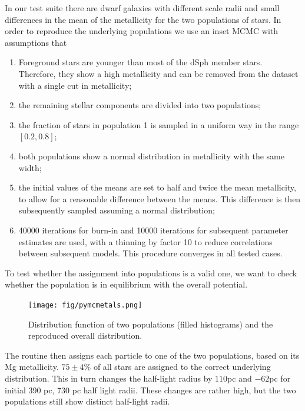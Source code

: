 In our test suite there are dwarf galaxies with different scale radii
and small differences in the mean of the metallicity for the two
populations of stars. In order to reproduce the underlying populations
we use an inset MCMC with assumptions that

\begin{enumerate}
\item Foreground stars are younger than most of the dSph member
  stars. Therefore, they show a high metallicity and can be removed
  from the dataset with a single cut in metallicity;
\item the remaining stellar components are divided into two
  populations;
\item the fraction of stars in population 1 is sampled in a uniform
  way in the range $[0.2,0.8]$;
\item both populations show a normal distribution in metallicity with
  the same width;
\item the initial values of the means are set to half and twice the
  mean metallicity, to allow for a reasonable difference between the
  means. This difference is then subsequently sampled assuming a
  normal distribution;
\item 40000 iterations for burn-in and 10000 iterations for subsequent
  parameter estimates are used, with a thinning by factor 10 to reduce
  correlations between subsequent models. This procedure converges in
  all tested cases.
\end{enumerate}

To test whether the assignment into populations is a valid one, we
want to check whether the population is in equilibrium with the
overall potential.

\begin{figure}
  \begin{center}
    \hspace{-7mm}
    \texttt{[image: fig/pymcmetals.png]}
    \caption{Distribution function of two populations (filled histograms) and the reproduced overall distribution.}
    \label{fig:pops}
  \end{center}
\end{figure}

The routine then assigns each particle to one of the two populations,
based on its Mg metallicity. $75\pm4\%$ of all stars are assigned to
the correct underlying distribution. This in turn changes the
half-light radius by $110$pc and $-62$pc for initial 390 pc, 730 pc
half light radii. These changes are rather high, but the two
populations still show distinct half-light radii.


